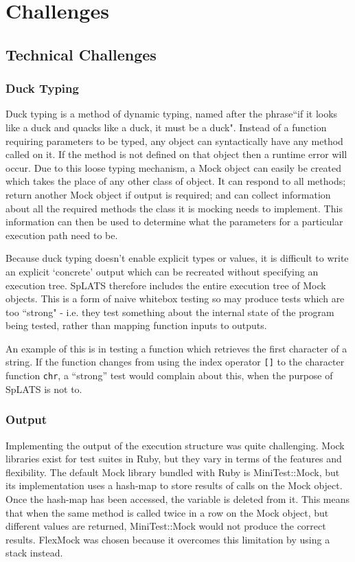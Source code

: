 \chapter{Challenges}
\section{Technical Challenges}
  \subsection{Duck Typing}
    Duck typing is a method of dynamic typing, named after the phrase``if it looks like a duck and quacks like a duck, it must be a duck". Instead of a function requiring parameters to be typed, any object can syntactically have any method called on it. If the method is not defined on that object then a runtime error will occur. Due to this loose typing mechanism, a Mock object can easily be created which takes the place of any other class of object. It can respond to all methods; return another Mock object if output is required; and can collect information about all the required methods the class it is mocking needs to implement. This information can then be used to determine what the parameters for a particular execution path need to be.

    Because duck typing doesn't enable explicit types or values, it is difficult to write an explicit `concrete' output which can be recreated without specifying an execution tree. SpLATS therefore includes the entire execution tree of Mock objects. This is a form of naive whitebox testing so may produce tests which are too ``strong" - i.e. they test something about the internal state of the program being tested, rather than mapping function inputs to outputs.
    
    An example of this is in testing a function which retrieves the first character of a string. If the function changes from using the index operator \texttt{[]} to the character function \texttt{chr}, a ``strong'' test would complain about this, when the purpose of SpLATS is not to.
    
  \subsection{Output}
    Implementing the output of the execution structure was quite challenging. Mock libraries exist for test suites in Ruby, but they vary in terms of the features and flexibility. The default Mock library bundled with Ruby is MiniTest::Mock, but its implementation uses a hash-map to store results of calls on the Mock object. Once the hash-map has been accessed, the variable is deleted from it. This means that when the same method is called twice in a row on the Mock object, but different values are returned, MiniTest::Mock would not produce the correct results. FlexMock was chosen because it overcomes this limitation by using a stack instead.

